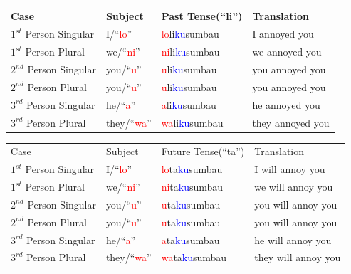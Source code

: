 \documentclass[11pt]{article}
\begin{document}
\begin{solution}
\begin{description}
\begin{tabular}{l l | l l}
Case & Subject & Past Tense(``\textcolor{OliveGreen}{li}'') & Translation \\ \hline
$1^{st}$ Person Singular & I/``\textcolor{red}{lo}'' & \textcolor{red}{lo}\textcolor{OliveGreen}{li}\textcolor{blue}{ku}\textcolor{BurntOrange}{sumbau} & I annoyed you \\
$1^{st}$ Person Plural & we/``\textcolor{red}{ni}'' & \textcolor{red}{ni}\textcolor{OliveGreen}{li}\textcolor{blue}{ku}\textcolor{BurntOrange}{sumbau} & we annoyed you \\
$2^{nd}$ Person Singular & you/``\textcolor{red}{u}'' & \textcolor{red}{u}\textcolor{OliveGreen}{li}\textcolor{blue}{ku}\textcolor{BurntOrange}{sumbau} & you annoyed you \\
$2^{nd}$ Person Plural & you/``\textcolor{red}{u}'' & \textcolor{red}{u}\textcolor{OliveGreen}{li}\textcolor{blue}{ku}\textcolor{BurntOrange}{sumbau} & you annoyed you \\
$3^{rd}$ Person Singular & he/``\textcolor{red}{a}'' & \textcolor{red}{a}\textcolor{OliveGreen}{li}\textcolor{blue}{ku}\textcolor{BurntOrange}{sumbau} & he annoyed you  \\
$3^{rd}$ Person Plural & they/``\textcolor{red}{wa}'' & \textcolor{red}{wa}\textcolor{OliveGreen}{li}\textcolor{blue}{ku}\textcolor{BurntOrange}{sumbau} & they annoyed you \\ \hline
\end{tabular}

\begin{tabular}{l l | l l}
 
Case & Subject & Future Tense(``\textcolor{OliveGreen}{ta}'') & Translation \\
$1^{st}$ Person Singular & I/``\textcolor{red}{lo}'' & \textcolor{red}{lo}\textcolor{OliveGreen}{ta}\textcolor{blue}{ku}\textcolor{BurntOrange}{sumbau} & I will annoy you \\
$1^{st}$ Person Plural & we/``\textcolor{red}{ni}'' & \textcolor{red}{ni}\textcolor{OliveGreen}{ta}\textcolor{blue}{ku}\textcolor{BurntOrange}{sumbau} & we will annoy you \\
$2^{nd}$ Person Singular & you/``\textcolor{red}{u}'' & \textcolor{red}{u}\textcolor{OliveGreen}{ta}\textcolor{blue}{ku}\textcolor{BurntOrange}{sumbau} & you will annoy you \\
$2^{nd}$ Person Plural & you/``\textcolor{red}{u}'' & \textcolor{red}{u}\textcolor{OliveGreen}{ta}\textcolor{blue}{ku}\textcolor{BurntOrange}{sumbau} & you will annoy you \\
$3^{rd}$ Person Singular & he/``\textcolor{red}{a}'' & \textcolor{red}{a}\textcolor{OliveGreen}{ta}\textcolor{blue}{ku}\textcolor{BurntOrange}{sumbau} & he will annoy you  \\
$3^{rd}$ Person Plural & they/``\textcolor{red}{wa}'' & \textcolor{red}{wa}\textcolor{OliveGreen}{ta}\textcolor{blue}{ku}\textcolor{BurntOrange}{sumbau} & they will annoy you \\ \hline
\end{tabular}


\end{description}
\end{solution}
\end{document}
